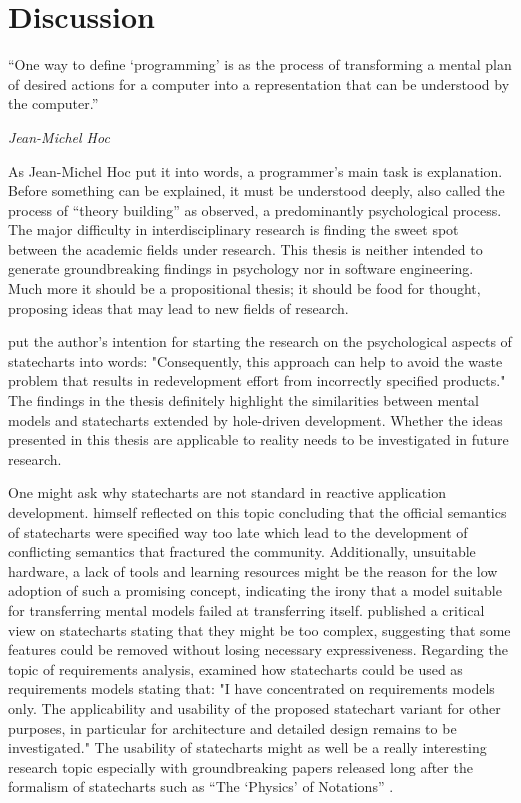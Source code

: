 \chapter{Discussion}
\label{chap:discussion}
\epigraph{``One way to define `programming' is as the process of transforming a mental plan of desired actions for a computer into a representation that can be understood by the computer.''}{\textit{Jean-Michel Hoc}}
As Jean-Michel Hoc put it into words, a programmer's main task is explanation.
Before something can be explained, it must be understood deeply, also called the process of ``theory building'' as \textcite{naur_programming_1985} observed, a predominantly psychological process.
The major difficulty in interdisciplinary research is finding the sweet spot between the academic fields under research.
This thesis is neither intended to generate groundbreaking findings in psychology nor in software engineering.
Much more it should be a propositional thesis; it should be food for thought, proposing ideas that may lead to new fields of research.

\textcite[10]{sheldon_software_2000} put the author's intention for starting the research on the psychological aspects of statecharts into words: "Consequently, this approach can help to avoid the waste problem that results in redevelopment effort from incorrectly specified products."
The findings in the thesis definitely highlight the similarities between mental models and statecharts extended by hole-driven development.
Whether the ideas presented in this thesis are applicable to reality needs to be investigated in future research.

One might ask why statecharts are not standard in reactive application development.
\textcite{harel_statecharts_2007} himself reflected on this topic concluding that the official semantics of statecharts were specified way too late which lead to the development of conflicting semantics that fractured the community.
Additionally, unsuitable hardware, a lack of tools and learning resources might be the reason for the low adoption of such a promising concept, indicating the irony that a model suitable for transferring mental models failed at transferring itself.
\textcite{breen_statecharts_2004} published a critical view on statecharts stating that they might be too complex, suggesting that some features could be removed without losing necessary expressiveness.
Regarding the topic of requirements analysis, \textcite{glinz_statecharts_2002} examined how statecharts could be used as requirements models stating that: "I have concentrated on requirements models only. The applicability and usability of the proposed statechart variant for other purposes, in particular for architecture and detailed design remains to be investigated." \autocite[5]{glinz_statecharts_2002}
The usability of statecharts might as well be a really interesting research topic especially with groundbreaking papers released long after the formalism of statecharts such as ``The `Physics' of Notations'' \autocite{moody_physics_2009}.

